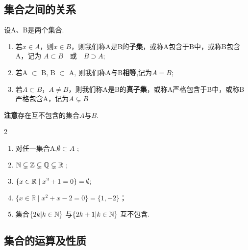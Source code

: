 \subsection{集合之间的关系}
	\label{sec:1-1-2}

\begin{mydef*}{}

设A、B是两个集合.

\begin{enumerate}[label=\arabic{enumi})]
	\item 若\(x\in A\)，则\(x\in B\)，则我们称A是B的\textbf{子集}，或称A包含于B中，或称B包含A，记为 $A\subset B\quad\text{或}\quad B\supset A;$
	\item 若A \(\subset\) B, B \(\subset\) A, 则我们称A与B\textbf{相等},记为$A = B$; 
	\item 若\(A\subset B\)，\(A\neq B\)，则我们称A是B的\textbf{真子集}，或称A严格包含于B中，或称B严格包含A，记为$A \subsetneq B$
\end{enumerate}


\end{mydef*}


\textbf{注意}\quad 存在互不包含的集合$A$与$B$.

\begin{sourceexample}{2}
	
	\begin{enumerate}[label=\arabic{enumi})]
		\item 对任一集合A,\(\emptyset \subset A\) ;
		\item \(\mathbb{N} \subsetneq \mathbb{Z} \subsetneq \mathbb{Q} \subsetneq \mathbb{R}\) ;
		\item \(\{x \in \mathbb{R} \mid x^2 + 1 = 0\} = \emptyset;\)
		\item \(\{x \in \mathbb{R} \mid x^2+x-2=0\}=\{1,-2\}\)；
		\item 集合\(\{2k | k \in \mathbb{N} \}\) 与\(\{2k+1 | k \in \mathbb{N} \}\) 互不包含.
	\end{enumerate}
\end{sourceexample}

\subsection{集合的运算及性质}
	\label{sec:1-1-3}

